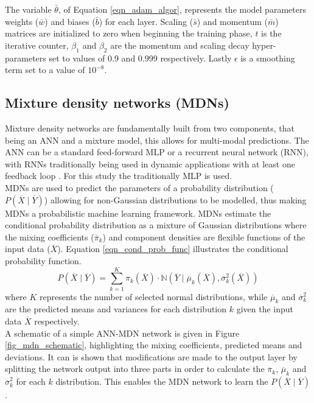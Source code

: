 \documentclass[a4paper,fleqn]{cas-dc}
\begin{document}
The variable $\bar{\theta}$, of Equation \ref{eqn_adam_algor}, represents the model parameters weights ($\bar{w}$) and biases ($\bar{b}$) for each layer. Scaling ($\bar{s}$) and momentum ($\bar{m}$) matrices are initialized to zero when beginning the training phase, $t$ is the iterative counter, $\beta_1$ and $\beta_2$ are the momentum and scaling decay hyper-parameters set to values of 0.9 and 0.999 respectively. Lastly $\epsilon$ is a smoothing term set to a value of $10^{-8}$.

\subsection{Mixture density networks (MDNs)}
Mixture density networks are fundamentally built from two components, that being an ANN and a mixture model, this allows for multi-modal predictions. The ANN can be a standard feed-forward MLP or a recurrent neural network (RNN), with RNNs traditionally being used in dynamic applications with at least one feedback loop \citep{Oko2015}. For this study the traditionally MLP is used.\\

MDNs are used to predict the parameters of a probability distribution ($P(\overline{X}\mid\overline{Y})$) allowing for non-Gaussian distributions to be modelled, thus making MDNs a probabilistic machine learning framework. MDNs estimate the conditional probability distribution as a mixture of Gaussian distributions where the mixing coefficients ($\overline{\pi}_k$) and component densities are flexible functions of the input data ($\overline{X}$). Equation \ref{eqn_cond_prob_func} illustrates the conditional probability function.
\begin{equation}\label{eqn_cond_prob_func}
P(\overline{X}\mid\overline{Y}) = \sum_{k=1}^K\pi_k(\overline{X})\cdot \mathbb{N}(\overline{Y}\mid \overline{\mu}_k(\overline{X}),\overline{\sigma}^2_k(\overline{X}))
\end{equation}
where $K$ represents the number of selected normal distributions, while $\overline{\mu}_k$ and $\overline{\sigma}^2_k$ are the predicted means and variances for each distribution $k$ given the input data $\overline{X}$ respectively.\\

A schematic of a simple ANN-MDN network is given in Figure \ref{fig_mdn_schematic}, highlighting the mixing coefficients, predicted means and deviations. It can is shown that modifications are made to the output layer by splitting the network output into three parts in order to calculate the $\overline{\pi}_k$, $\overline{\mu}_k$ and $\overline{\sigma}^2_k$ for each $k$ distribution. This enables the MDN network to learn the $P(\overline{X}\mid\overline{Y})$.\\
\end{document}

